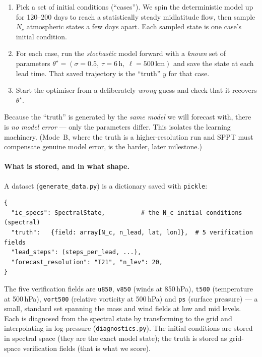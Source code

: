 \documentclass[11pt]{article}
\newcommand{\code}[1]{\texttt{#1}}
\begin{document}
\begin{enumerate}
\item Pick a set of initial conditions (``cases''). We spin the deterministic
  model up for 120--200 days to reach a statistically steady midlatitude flow,
  then sample $N_c$ atmospheric states a few days apart. Each sampled state is
  one case's initial condition.
\item For each case, run the \emph{stochastic} model forward with a \emph{known}
  set of parameters $\theta^\star=(\sigma=0.5,\ \tau=6\,\text{h},\
  \ell=500\,\text{km})$ and save the state at each lead time. That saved
  trajectory is the ``truth'' $y$ for that case.
\item Start the optimiser from a deliberately \emph{wrong} guess and check that it
  recovers $\theta^\star$.
\end{enumerate}

Because the ``truth'' is generated by the \emph{same model} we will forecast with,
there is \emph{no model error} --- only the parameters differ. This isolates the
learning machinery. (Mode~B, where the truth is a higher-resolution run and SPPT
must compensate genuine model error, is the harder, later milestone.)

\paragraph{What is stored, and in what shape.} A dataset
(\code{generate\_data.py}) is a dictionary saved with \code{pickle}:
\begin{lstlisting}
{
  "ic_specs": SpectralState,          # the N_c initial conditions (spectral)
  "truth":   {field: array[N_c, n_lead, lat, lon]},  # 5 verification fields
  "lead_steps": (steps_per_lead, ...),
  "forecast_resolution": "T21", "n_lev": 20,
}
\end{lstlisting}
The five verification fields are \code{u850}, \code{v850} (winds at 850\,hPa),
\code{t500} (temperature at 500\,hPa), \code{vort500} (relative vorticity at
500\,hPa) and \code{ps} (surface pressure) --- a small, standard set spanning the
mass and wind fields at low and mid levels. Each is diagnosed from the spectral
state by transforming to the grid and interpolating in log-pressure
(\code{diagnostics.py}). The initial conditions are stored in spectral space
(they are the exact model state); the truth is stored as grid-space verification
fields (that is what we score).
\end{document}
